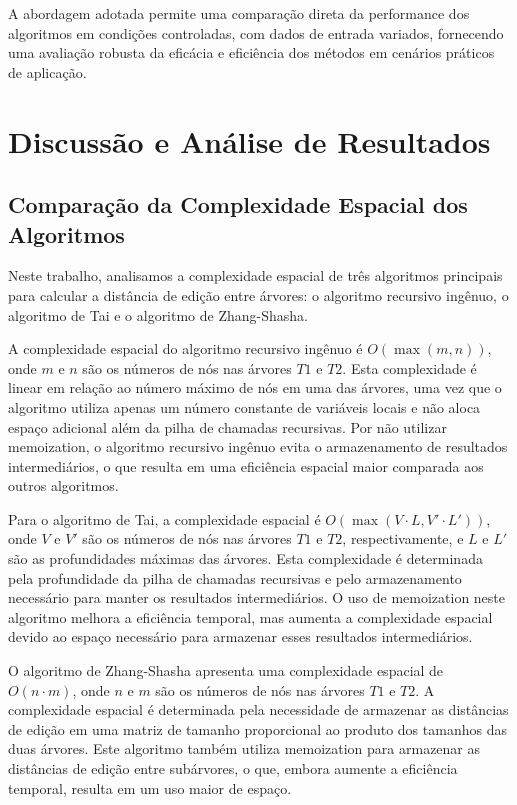 \documentclass[12pt]{article}
\begin{document}
A abordagem adotada permite uma comparação direta da performance dos algoritmos em condições controladas, com dados de entrada variados, fornecendo uma avaliação robusta da eficácia e eficiência dos métodos em cenários práticos de aplicação.


\section{Discussão e Análise de Resultados}

\subsection{Comparação da Complexidade Espacial dos Algoritmos}


Neste trabalho, analisamos a complexidade espacial de três algoritmos principais para calcular a distância de edição entre árvores: o algoritmo recursivo ingênuo, o algoritmo de Tai e o algoritmo de Zhang-Shasha.

A complexidade espacial do algoritmo recursivo ingênuo é \(O(\max(m, n))\), onde \(m\) e \(n\) são os números de nós nas árvores \(T1\) e \(T2\). Esta complexidade é linear em relação ao número máximo de nós em uma das árvores, uma vez que o algoritmo utiliza apenas um número constante de variáveis locais e não aloca espaço adicional além da pilha de chamadas recursivas. Por não utilizar memoization, o algoritmo recursivo ingênuo evita o armazenamento de resultados intermediários, o que resulta em uma eficiência espacial maior comparada aos outros algoritmos.

Para o algoritmo de Tai, a complexidade espacial é \(O(\max(V \cdot L, V' \cdot L'))\), onde \(V\) e \(V'\) são os números de nós nas árvores \(T1\) e \(T2\), respectivamente, e \(L\) e \(L'\) são as profundidades máximas das árvores. Esta complexidade é determinada pela profundidade da pilha de chamadas recursivas e pelo armazenamento necessário para manter os resultados intermediários. O uso de memoization neste algoritmo melhora a eficiência temporal, mas aumenta a complexidade espacial devido ao espaço necessário para armazenar esses resultados intermediários.

O algoritmo de Zhang-Shasha apresenta uma complexidade espacial de \(O(n \cdot m)\), onde \(n\) e \(m\) são os números de nós nas árvores \(T1\) e \(T2\). A complexidade espacial é determinada pela necessidade de armazenar as distâncias de edição em uma matriz de tamanho proporcional ao produto dos tamanhos das duas árvores. Este algoritmo também utiliza memoization para armazenar as distâncias de edição entre subárvores, o que, embora aumente a eficiência temporal, resulta em um uso maior de espaço.
\end{document}
